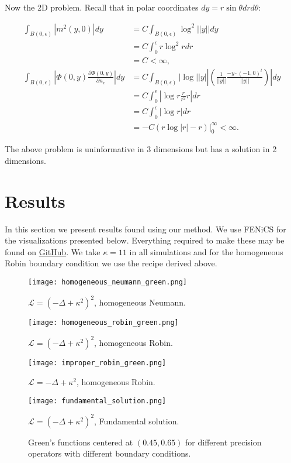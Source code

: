 \documentclass[paper=a4, fontsize=11pt]{scrartcl} %
\numberwithin{equation}{section} %
\numberwithin{figure}{section} %
\numberwithin{table}{section} %
\newcommand{\Op}{\mathcal{L}}
\begin{document}
Now the 2D problem. Recall that in polar coordinates $dy = r\sin \theta dr d\theta$:

\begin{align*}
     \int_{B(0,\epsilon)} |m^2(y,0)|dy &= C \int_{B(0,\epsilon)} \log^2||y|| dy \\
    &= C \int_{0}^{\epsilon} r \log^2 r dr \\
    &= C < \infty, \\
    \int_{B(0,\epsilon)} |\Phi(0,y) \frac{\partial \Phi(0,y)}{\partial n_x}| dy &= C \int_{B(0,\epsilon)} |\log||y|| (\frac{1}{||y||} \frac{-y\cdot (-1,0)^t}{||y||})| dy\\
    &= C\int_{0}^{\epsilon} |\log r\frac{r }{r^2}r| dr\\
    &= C \int_{0}^{\epsilon} |\log r| dr \\
    &= -C(r \log |r| - r)|_{0}^{\infty} < \infty.
\end{align*}

The above problem is uninformative in 3 dimensions but has a solution in 2 dimensions.

\section{Results}
In this section we present results found using our method. We use FENiCS \cite{fenics} for
the visualizations presented below. Everything required to make these may be found on 
\href{https://github.com/yairdaon/covariances}{GitHub}. We take $\kappa = 11$ 
in all simulations and for the homogeneous Robin boundary condition we use the
recipe derived above.

\begin{figure}[!htb]
  \texttt{[image: homogeneous\_neumann\_green.png]}
   \caption*{$\Op = (-\Delta + \kappa^2)^2$, homogeneous Neumann.}
\endminipage\hfill
{}
  \texttt{[image: homogeneous\_robin\_green.png]}
   \caption*{$\Op = (-\Delta + \kappa^2)^2$, homogeneous Robin.}
\endminipage\hfill

  \texttt{[image: improper\_robin\_green.png]}
   \caption*{$\Op = -\Delta + \kappa^2$, homogeneous Robin.}
\endminipage\hfill
{}
  \texttt{[image: fundamental\_solution.png]}
   \caption*{$\Op = (-\Delta + \kappa^2)^2$, Fundamental solution.}
\endminipage
 \caption{Green's functions centered at $(0.45,0.65)$ for 
   different precision operators with different boundary conditions.}
\end{figure}
 
\end{document}
